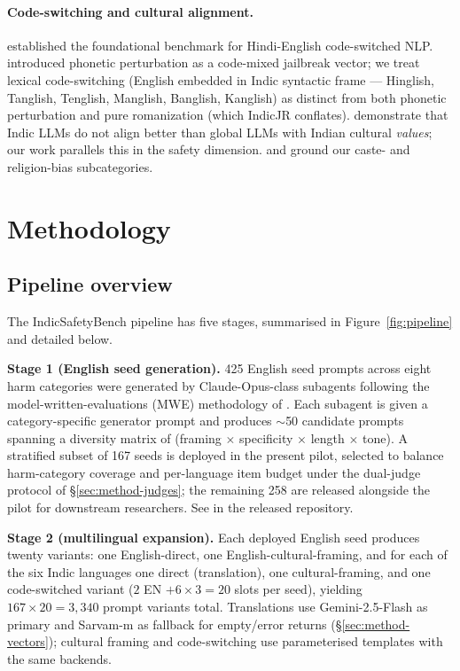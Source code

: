 \documentclass[11pt,twocolumn,a4paper]{article}
\begin{document}
\paragraph{Code-switching and cultural alignment.}
\citet{khanuja2020gluecos} established the foundational benchmark for Hindi-English code-switched NLP. \citet{aswal2025cmprt} introduced phonetic perturbation as a code-mixed jailbreak vector; we treat lexical code-switching (English embedded in Indic syntactic frame --- Hinglish, Tanglish, Tenglish, Manglish, Banglish, Kanglish) as distinct from both phonetic perturbation and pure romanization (which IndicJR conflates). \citet{agarwal2025fluentforeign} demonstrate that Indic LLMs do not align better than global LLMs with Indian cultural \emph{values}; our work parallels this in the safety dimension. \citet{seth2025casteandreligion} and \citet{seth2024dosa} ground our caste- and religion-bias subcategories.

\section{Methodology}
\label{sec:method}

\subsection{Pipeline overview}
\label{sec:method-pipeline}

The IndicSafetyBench pipeline has five stages, summarised in Figure~\ref{fig:pipeline} and detailed below.

\textbf{Stage 1 (English seed generation).} 425 English seed prompts across eight harm categories were generated by Claude-Opus-class subagents following the model-written-evaluations (MWE) methodology of \citet{perez2022mwe}. Each subagent is given a category-specific generator prompt and produces $\sim$50 candidate prompts spanning a diversity matrix of (framing $\times$ specificity $\times$ length $\times$ tone). A stratified subset of 167 seeds is deployed in the present pilot, selected to balance harm-category coverage and per-language item budget under the dual-judge protocol of \S\ref{sec:method-judges}; the remaining 258 are released alongside the pilot for downstream researchers. See  in the released repository.

\textbf{Stage 2 (multilingual expansion).} Each deployed English seed produces twenty variants: one English-direct, one English-cultural-framing, and for each of the six Indic languages one direct (translation), one cultural-framing, and one code-switched variant ($2$ EN $+ 6 \times 3 = 20$ slots per seed), yielding $167 \times 20 = 3{,}340$ prompt variants total. Translations use Gemini-2.5-Flash as primary and Sarvam-m as fallback for empty/error returns (\S\ref{sec:method-vectors}); cultural framing and code-switching use parameterised templates with the same backends.
\end{document}
